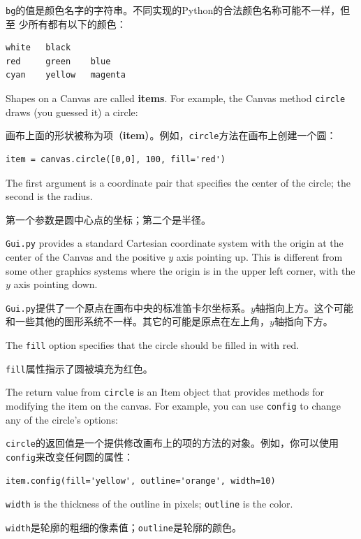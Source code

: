 \documentclass[10pt]{book}
\begin{document}
\begin{CJK}{UTF8}{gbsn}
{\tt bg}的值是颜色名字的字符串。不同实现的Python的合法颜色名称可能不一样，但至
少所有都有以下的颜色：

\begin{verbatim}
white   black
red     green    blue   
cyan    yellow   magenta
\end{verbatim}
%
Shapes on a Canvas are called {\bf items}.  For example,
the Canvas method {\tt circle} draws (you guessed it) a circle:

画布上面的形状被称为项（{\bf item}）。例如，{\tt circle}方法在画布上创建一个圆：

\begin{verbatim}
item = canvas.circle([0,0], 100, fill='red')
\end{verbatim}
%
The first argument is a coordinate pair that specifies the
center of the circle; the second is the radius.

第一个参数是圆中心点的坐标；第二个是半径。

{\tt Gui.py} provides a standard Cartesian coordinate system with
the origin at the center of the Canvas and the positive $y$ axis
pointing up.  This is different from some other graphics systems
where the origin is in the upper left corner, with the $y$ axis
pointing down.

{\tt Gui.py}提供了一个原点在画布中央的标准笛卡尔坐标系。$y$轴指向上方。这个可能
和一些其他的图形系统不一样。其它的可能是原点在左上角，$y$轴指向下方。

The {\tt fill} option specifies that the circle should be filled
in with red.

{\tt fill}属性指示了圆被填充为红色。

The return value from {\tt circle} is an Item object that
provides methods for modifying the item on the canvas.  For
example, you can use {\tt config} to change any of the circle's
options:

{\tt circle}的返回值是一个提供修改画布上的项的方法的对象。例如，你可以使用{\tt
config}来改变任何圆的属性：

\begin{verbatim}
item.config(fill='yellow', outline='orange', width=10)
\end{verbatim}
%
{\tt width} is the thickness of the outline in pixels;
{\tt outline} is the color.

{\tt width}是轮廓的粗细的像素值；{\tt outline}是轮廓的颜色。

\begin{exercise}
\label{circle}


\end{exercise}
\end{CJK}
\end{document}
